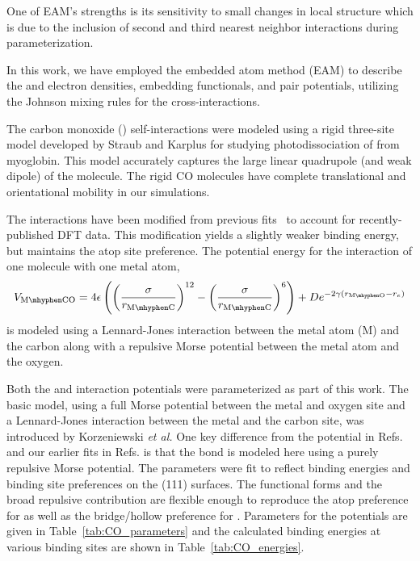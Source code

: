 One of EAM's strengths is its sensitivity to small changes in local
structure which is due to the inclusion of second and third nearest
neighbor interactions during parameterization.\citep{Voter:1995fk}

In this work, we have employed the embedded atom method (EAM) to
describe the  and  electron densities, embedding
functionals, and pair potentials,\citep{EAM} utilizing the Johnson
mixing rules for the 
cross-interactions.\citep{Johnson89}

The carbon monoxide () self-interactions were modeled using a
rigid three-site model developed by Straub and Karplus for studying
photodissociation of  from myoglobin.\citep{Straub} This model
accurately captures the large linear quadrupole (and weak dipole) of
the  molecule. The rigid CO molecules have complete
translational and orientational mobility in our simulations.

The  interactions have been modified from previous
fits~\citep{Michalka:2013} to account for recently-published DFT
data.\citep{Deshlahra:2012} This modification yields a slightly weaker
 binding energy, but maintains the atop site
preference.  The potential energy for the interaction of one 
molecule with one metal atom,
\begin{equation*}
V_\mathrm{M\mhyphen CO} = 4 \epsilon \left(
  \left(\frac{\sigma}{r_\mathrm{M\mhyphen C}}\right)^{12} -
  \left(\frac{\sigma}{r_\mathrm{M\mhyphen C}}\right)^6 \right) +
D e^{-2 \gamma (r_\mathrm{M\mhyphen O} - r_e)}
\label{eq:pot}
\end{equation*}
is modeled using a Lennard-Jones interaction between the metal atom
(M) and the carbon along with a repulsive Morse potential between the
metal atom and the oxygen.

Both the  and  interaction
potentials were parameterized as part of this work. The basic model,
using a full Morse potential between the metal and oxygen site and a
Lennard-Jones interaction between the metal and the carbon site, was
introduced by Korzeniewski \textit{et al.}\citep{Pons:1986} One key
difference from the potential in Refs. and our
earlier fits in Refs. is that the
 bond is modeled here using a purely repulsive Morse
potential. The parameters were fit to reflect binding energies and
binding site preferences on the (111) surfaces.  The functional
forms and the broad repulsive  contribution are
flexible enough to reproduce the atop preference for 
as well as the bridge/hollow preference for .
Parameters for the potentials are given in
Table~\ref{tab:CO_parameters} and the calculated binding energies at
various binding sites are shown in Table~\ref{tab:CO_energies}.

